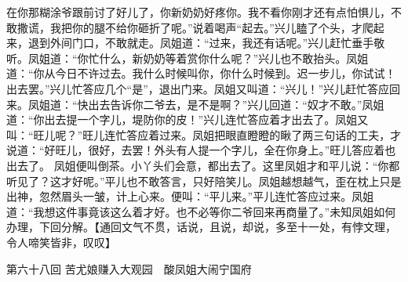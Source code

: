\documentclass[12pt,oneside]{book}
\begin{document}
在你那糊涂爷跟前讨了好儿了，你新奶奶好疼你。我不看你刚才还有点怕惧儿，不敢撒谎，我把你的腿不给你砸折了呢。”说着喝声“起去。”兴儿瞌了个头，才爬起来，退到外间门口，不敢就走。凤姐道：“过来，我还有话呢。”兴儿赶忙垂手敬听。凤姐道：“你忙什么，新奶奶等着赏你什么呢？”兴儿也不敢抬头。凤姐道：“你从今日不许过去。我什么时候叫你，你什么时候到。迟一步儿，你试试！出去罢。”兴儿忙答应几个“是”，退出门来。凤姐又叫道：“兴儿！”兴儿赶忙答应回来。凤姐道：“快出去告诉你二爷去，是不是啊？”兴儿回道：“奴才不敢。”凤姐道：“你出去提一个字儿，堤防你的皮！”兴儿连忙答应着才出去了。凤姐又叫：“旺儿呢？”旺儿连忙答应着过来。凤姐把眼直瞪瞪的瞅了两三句话的工夫，才说道：“好旺儿，很好，去罢！外头有人提一个字儿，全在你身上。”旺儿答应着也出去了。
凤姐便叫倒茶。小丫头们会意，都出去了。这里凤姐才和平儿说：“你都听见了？这才好呢。”平儿也不敢答言，只好陪笑儿。凤姐越想越气，歪在枕上只是出神，忽然眉头一皱，计上心来。便叫：“平儿来。”平儿连忙答应过来。凤姐道：“我想这件事竟该这么着才好。也不必等你二爷回来再商量了。”未知凤姐如何办理，下回分解。【通回文气不贯，话说，且说，却说，多至十一处，有悖文理，令人啼笑皆非，叹叹】





 
第六十八回  苦尤娘赚入大观园　酸凤姐大闹宁国府
\end{document}
